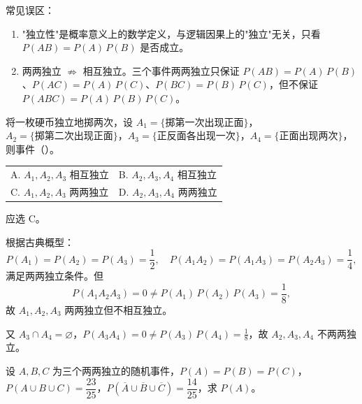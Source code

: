 \documentclass[lang=cn,11pt]{elegantbook}
\begin{document}
\begin{note}
常见误区：
\begin{enumerate}
    \item "独立性"是概率意义上的数学定义，与逻辑因果上的"独立"无关，只看 \(P(AB)=P(A)\,P(B)\) 是否成立。
    \item 两两独立 \(\nRightarrow\) 相互独立。三个事件两两独立只保证 \(P(AB)=P(A)\,P(B)\)、\(P(AC)=P(A)\,P(C)\)、\(P(BC)=P(B)\,P(C)\)，但不保证 \(P(ABC)=P(A)\,P(B)\,P(C)\)。
\end{enumerate}
\end{note}

\begin{exercise}\label{exer:1-17}
将一枚硬币独立地掷两次，设 \(A_1=\{\text{掷第一次出现正面}\}\)，\(A_2=\{\text{掷第二次出现正面}\}\)，\(A_3=\{\text{正反面各出现一次}\}\)，\(A_4=\{\text{正面出现两次}\}\)，则事件（\quad）。\par
\begin{tabular}{ll}
A. \(A_1,A_2,A_3\) 相互独立 & B. \(A_2,A_3,A_4\) 相互独立 \\[4pt]
C. \(A_1,A_2,A_3\) 两两独立 & D. \(A_2,A_3,A_4\) 两两独立
\end{tabular}
\end{exercise}

\begin{solution}
应选 C。

根据古典概型：
\[
P(A_1)=P(A_2)=P(A_3)=\frac{1}{2}, \quad P(A_1A_2)=P(A_1A_3)=P(A_2A_3)=\frac{1}{4},
\]
满足两两独立条件。但
\[
P(A_1A_2A_3)=0 \neq P(A_1)\,P(A_2)\,P(A_3)=\frac{1}{8},
\]
故 \(A_1, A_2, A_3\) 两两独立但不相互独立。

又 \(A_3 \cap A_4 = \varnothing\)，\(P(A_3A_4)=0 \neq P(A_3)\,P(A_4)=\frac{1}{8}\)，故 \(A_2, A_3, A_4\) 不两两独立。
\end{solution}

\begin{exercise}\label{exer:1-18}
设 \(A, B, C\) 为三个两两独立的随机事件，\(P(A)=P(B)=P(C)\)，\(P(A \cup B \cup C)=\dfrac{23}{25}\)，\(P(\overline{A} \cup \overline{B} \cup \overline{C})=\dfrac{14}{25}\)，求 \(P(A)\)。
\end{exercise}
\end{document}
